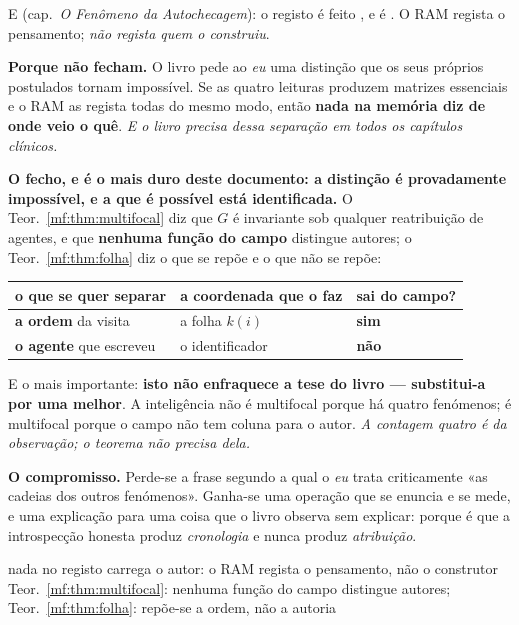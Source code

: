 \documentclass[../livro.tex]{subfiles}
\begin{document}
\noindent E (cap.~\emph{O Fenômeno da Autochecagem}): o registo é feito
, e é . O RAM regista o pensamento;
\emph{não regista quem o construiu}.

\medskip\noindent\textbf{Porque não fecham.} O livro pede ao \emph{eu} uma
distinção que os seus próprios postulados tornam impossível. Se as quatro
leituras produzem matrizes essenciais e o RAM as regista todas do mesmo modo,
então \textbf{nada na memória diz de onde veio o quê}. \emph{E o livro precisa
dessa separação em todos os capítulos clínicos.}

\medskip\noindent\textbf{O fecho, e é o mais duro deste documento: a distinção é
provadamente impossível, e a que é possível está identificada.} O
Teor.~\ref{mf:thm:multifocal} diz que $G$ é invariante sob qualquer reatribuição
de agentes, e que \textbf{nenhuma função do campo} distingue autores; o
Teor.~\ref{mf:thm:folha} diz o que se repõe e o que não se repõe:

\begin{center}\small
\begin{tabular}{@{}lll@{}}
\toprule
o que se quer separar & a coordenada que o faz & sai do campo? \\
\midrule
\textbf{a ordem} da visita & a folha $k(i)$ & \textbf{sim} \\
\textbf{o agente} que escreveu & o identificador & \textbf{não} \\
\bottomrule
\end{tabular}
\end{center}

\noindent E o mais importante: \textbf{isto não enfraquece a tese do livro ---
substitui-a por uma melhor}. A inteligência não é multifocal porque há quatro
fenómenos; é multifocal porque o campo não tem coluna para o autor. \emph{A
contagem quatro é da observação; o teorema não precisa dela.}

\medskip\noindent\textbf{O compromisso.} Perde-se a frase segundo a qual o
\emph{eu} trata criticamente «as cadeias dos outros fenómenos». Ganha-se uma
operação que se enuncia e se mede, e uma explicação para uma coisa que o livro
observa sem explicar: porque é que a introspecção honesta produz
\emph{cronologia} e nunca produz \emph{atribuição}.

      {nada no registo carrega o autor: o RAM regista o pensamento, não o
       construtor}
      {Teor.~\ref{mf:thm:multifocal}: nenhuma função do campo distingue autores;
       Teor.~\ref{mf:thm:folha}: repõe-se a ordem, não a autoria}
\end{document}
